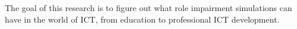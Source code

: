 The goal of this research is to figure out what role impairment simulations can have in the world of ICT, from education to professional ICT development.









